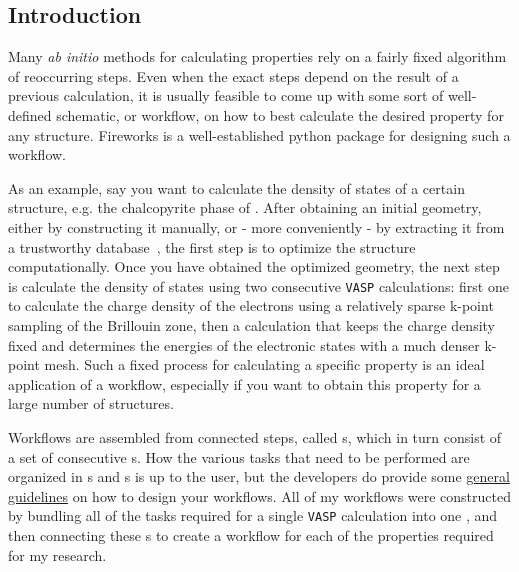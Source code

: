 \begin{refsection}
\pagebreak 
 
\section{Introduction} \label{automation:sec-intro} 
 
Many \textit{ab initio} methods for calculating properties rely on a fairly 
fixed algorithm of reoccurring steps. Even when the exact steps depend on the 
result of a previous calculation, it is usually feasible to come up with some 
sort of well-defined schematic, or workflow, on how to best calculate the 
desired property for any structure. Fireworks is a well-established python 
package for designing such a workflow. 
 
As an example, say you want to calculate the density of states of a certain 
structure, e.g. the chalcopyrite phase of . After obtaining an 
initial geometry, either by constructing it manually, or - more conveniently - 
by extracting it from a trustworthy database~\cite{Jain2013}, the first step 
is to optimize the structure computationally. Once you have obtained the 
optimized geometry, the next step is calculate the density of states using two 
consecutive \texttt{VASP} calculations: first one to calculate the charge 
density of the electrons using a relatively sparse k-point sampling of the 
Brillouin zone, then a calculation that keeps the charge density fixed and 
determines the energies of the electronic states with a much denser k-point 
mesh. Such a fixed process for calculating a specific property is an ideal 
application of a workflow, especially if you want to obtain this property for 
a large number of structures.  
 
Workflows are assembled from connected steps, called 
\href{https://github.com/materialsproject/fireworks/blob/master/fireworks/core/firework.py#L196}{}s, 
which in turn consist of a set of consecutive 
\href{https://github.com/materialsproject/fireworks/blob/master/fireworks/core/firework.py#L46}{}s. 
How the various tasks that need to be performed are organized in 
s and s is up to the user, but the developers do 
provide some 
\href{https://materialsproject.github.io/fireworks/design_tips.html}{general 
guidelines} on how to design your workflows. All of my workflows were 
constructed by bundling all of the tasks required for a single \texttt{VASP} 
calculation into one , and then connecting these 
s to create a workflow for each of the properties required for 
my research. 
 

\end{refsection}
